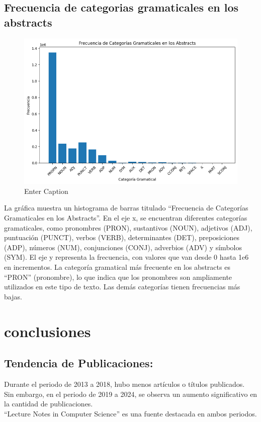 \documentclass[conference]{IEEEtran}
\begin{document}
\subsection{Frecuencia de categorias gramaticales en los abstracts}
\begin{figure}[H]
    \centering
    \includegraphics[width=1\linewidth]{mapaabstract.png}
    \caption{Enter Caption}
    \label{fig:enter-label}
\end{figure}
La gráfica muestra un histograma de barras titulado “Frecuencia de Categorías Gramaticales en los Abstracts”.
En el eje x, se encuentran diferentes categorías gramaticales, como pronombres (PRON), sustantivos (NOUN), adjetivos (ADJ), puntuación (PUNCT), verbos (VERB), determinantes (DET), preposiciones (ADP), números (NUM), conjunciones (CONJ), adverbios (ADV) y símbolos (SYM).
El eje y representa la frecuencia, con valores que van desde 0 hasta 1e6 en incrementos.
La categoría gramatical más frecuente en los abstracts es “PRON” (pronombre), lo que indica que los pronombres son ampliamente utilizados en este tipo de texto. Las demás categorías tienen frecuencias más bajas.

\section{conclusiones}

\subsection{Tendencia de Publicaciones:}
Durante el periodo de 2013 a 2018, hubo menos artículos o títulos publicados.\\
Sin embargo, en el periodo de 2019 a 2024, se observa un aumento significativo en la cantidad de publicaciones.\\
“Lecture Notes in Computer Science” es una fuente destacada en ambos periodos.
\end{document}
